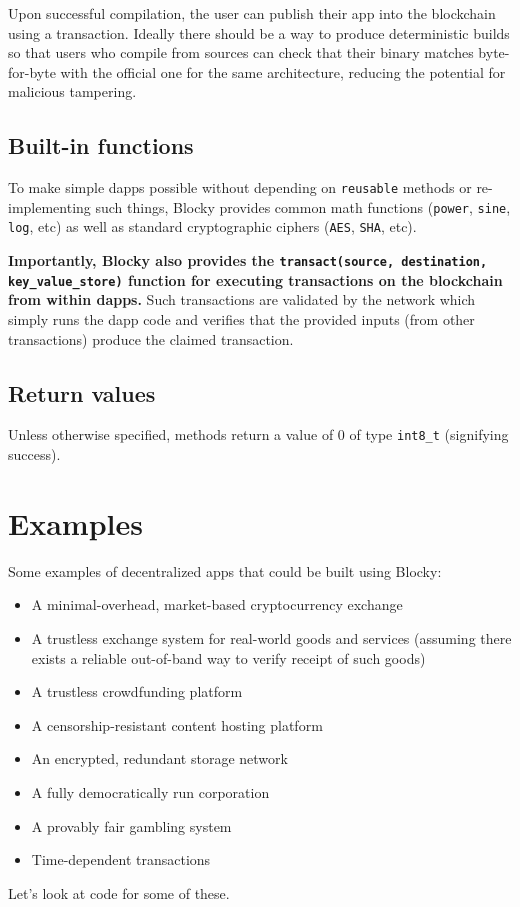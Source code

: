 \documentclass[letterpaper]{article}
\begin{document}
Upon successful compilation, the user can publish their app into the blockchain using a transaction. Ideally there should be a way to produce deterministic builds so that users who compile from sources can check that their binary matches byte-for-byte with the official one for the same architecture, reducing the potential for malicious tampering.

\subsection{Built-in functions}
To make simple dapps possible without depending on \texttt{reusable} methods or re-implementing such things, Blocky provides common math functions (\texttt{power}, \texttt{sine}, \texttt{log}, etc) as well as standard cryptographic ciphers (\texttt{AES}, \texttt{SHA}, etc).

\textbf{Importantly, Blocky also provides the \texttt{transact(source, destination, key\_value\_store)} function for executing transactions on the blockchain from within dapps.} Such transactions are validated by the network which simply runs the dapp code and verifies that the provided inputs (from other transactions) produce the claimed transaction.

\subsection{Return values}
Unless otherwise specified, methods return a value of 0 of type \texttt{int8\_t} (signifying success).

\section{Examples}

Some examples of decentralized apps that could be built using Blocky:
\begin{itemize}
  \item{A minimal-overhead, market-based cryptocurrency exchange}
  \item{A trustless exchange system for real-world goods and services (assuming there exists a reliable out-of-band way to verify receipt of such goods)}
  \item{A trustless crowdfunding platform}
  \item{A censorship-resistant content hosting platform}
  \item{An encrypted, redundant storage network}
  \item{A fully democratically run corporation}
  \item{A provably fair gambling system}
  \item{Time-dependent transactions}
\end{itemize}
\bigskip
Let's look at code for some of these.
\end{document}
